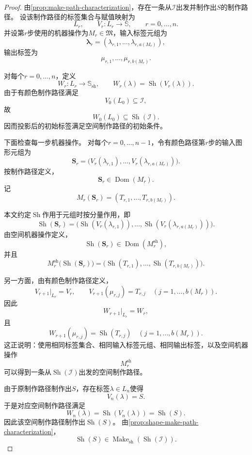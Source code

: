\documentclass[UTF8,fontset=none]{ctexart}
\theoremstyle{cnthm}
\begin{document}
			\begin{proof}
				由\cref{prop:make-path-characterization}，存在一条从$\mathcal{I}$出发并制作出$S$的制作路径。
				设该制作路径的标签集合与赋值映射为
				$$
				L_r,\qquad V_r:L_r\to\mathbb{S},
				\qquad r=0,\dots,n.
				$$
				并设第$r$步使用的机器操作为$M_r\in\mathfrak{M}$，输入标签元组为
				$$
				\boldsymbol{\lambda}_r
				=
				(\lambda_{r,1},\dots,\lambda_{r,a(M_r)}),
				$$
				输出标签为
				$$
				\mu_{r,1},\dots,\mu_{r,b(M_r)}.
				$$
				
				对每个$r=0,\dots,n$，定义
				$$
				W_r:L_r\to\mathbb{S}_{\mathrm{sh}},
				\qquad
				W_r(\lambda)=\operatorname{Sh}(V_r(\lambda)).
				$$
				由于有颜色制作路径满足
				$$
				V_0(L_0)\subseteq\mathcal{I},
				$$
				故
				$$
				W_0(L_0)\subseteq\operatorname{Sh}(\mathcal{I}).
				$$
				因而投影后的初始标签满足空间制作路径的初始条件。
				
				下面检查每一步机器操作。
				对每个$r=0,\dots,n-1$，令有颜色路径第$r$步的输入图形元组为
				$$
				\mathbf{S}_r
				=
				\bigl(
				V_r(\lambda_{r,1}),\dots,V_r(\lambda_{r,a(M_r)})
				\bigr).
				$$
				按制作路径定义，
				$$
				\mathbf{S}_r\in\operatorname{Dom}(M_r).
				$$
				记
				$$
				M_r(\mathbf{S}_r)
				=
				(T_{r,1},\dots,T_{r,b(M_r)}).
				$$
				
				本文约定$\operatorname{Sh}$作用于元组时按分量作用，即
				$$
				\operatorname{Sh}(\mathbf{S}_r)
				=
				\bigl(
				\operatorname{Sh}(V_r(\lambda_{r,1})),\dots,
				\operatorname{Sh}(V_r(\lambda_{r,a(M_r)}))
				\bigr).
				$$
				由空间机器操作定义，
				$$
				\operatorname{Sh}(\mathbf{S}_r)
				\in
				\operatorname{Dom}(M_r^{\mathrm{sh}}),
				$$
				并且
				$$
				M_r^{\mathrm{sh}}\bigl(\operatorname{Sh}(\mathbf{S}_r)\bigr)
				=
				\bigl(
				\operatorname{Sh}(T_{r,1}),\dots,\operatorname{Sh}(T_{r,b(M_r)})
				\bigr).
				$$
				
				另一方面，由有颜色制作路径定义，
				$$
				V_{r+1}|_{L_r}=V_r,
				\qquad
				V_{r+1}(\mu_{r,j})=T_{r,j}
				\quad(j=1,\dots,b(M_r)).
				$$
				因此
				$$
				W_{r+1}|_{L_r}=W_r,
				$$
				且
				$$
				W_{r+1}(\mu_{r,j})
				=
				\operatorname{Sh}(T_{r,j})
				\quad(j=1,\dots,b(M_r)).
				$$
				这正说明：使用相同标签集合、相同输入标签元组、相同输出标签，以及空间机器操作
				$$
				M_r^{\mathrm{sh}}
				$$
				可以得到一条从$\operatorname{Sh}(\mathcal{I})$出发的空间制作路径。
				
				由于原制作路径制作出$S$，存在标签$\lambda\in L_n$使得
				$$
				V_n(\lambda)=S.
				$$
				于是对应空间制作路径满足
				$$
				W_n(\lambda)
				=
				\operatorname{Sh}(V_n(\lambda))
				=
				\operatorname{Sh}(S).
				$$
				因此该空间制作路径制作出$\operatorname{Sh}(S)$。
				由\cref{prop:shape-make-path-characterization}，
				$$
				\operatorname{Sh}(S)
				\in
				\operatorname{Make}_{\mathrm{sh}}(\operatorname{Sh}(\mathcal{I})).
				$$
			\end{proof}
			
\end{document}

